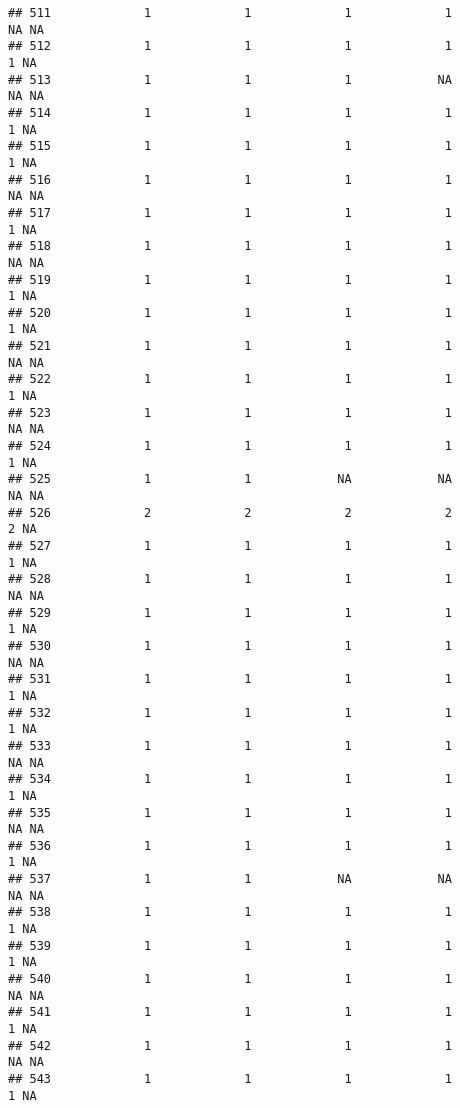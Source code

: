 \documentclass[
]{article}
\begin{document}
\begin{verbatim}
## 511             1             1             1             1            NA NA
## 512             1             1             1             1             1 NA
## 513             1             1             1            NA            NA NA
## 514             1             1             1             1             1 NA
## 515             1             1             1             1             1 NA
## 516             1             1             1             1            NA NA
## 517             1             1             1             1             1 NA
## 518             1             1             1             1            NA NA
## 519             1             1             1             1             1 NA
## 520             1             1             1             1             1 NA
## 521             1             1             1             1            NA NA
## 522             1             1             1             1             1 NA
## 523             1             1             1             1            NA NA
## 524             1             1             1             1             1 NA
## 525             1             1            NA            NA            NA NA
## 526             2             2             2             2             2 NA
## 527             1             1             1             1             1 NA
## 528             1             1             1             1            NA NA
## 529             1             1             1             1             1 NA
## 530             1             1             1             1            NA NA
## 531             1             1             1             1             1 NA
## 532             1             1             1             1             1 NA
## 533             1             1             1             1            NA NA
## 534             1             1             1             1             1 NA
## 535             1             1             1             1            NA NA
## 536             1             1             1             1             1 NA
## 537             1             1            NA            NA            NA NA
## 538             1             1             1             1             1 NA
## 539             1             1             1             1             1 NA
## 540             1             1             1             1            NA NA
## 541             1             1             1             1             1 NA
## 542             1             1             1             1            NA NA
## 543             1             1             1             1             1 NA

\end{verbatim}
\end{document}
